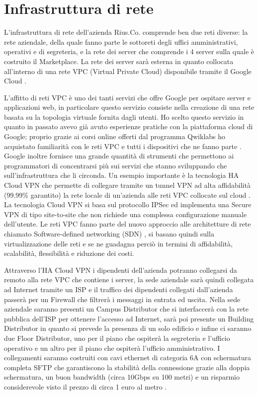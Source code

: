 \section{Infrastruttura di rete}
L'infrastruttura di rete dell'azienda Rius.Co. comprende ben due reti diverse: la rete aziendale, della quale fanno parte le sottoreti degli uffici amministrativi, operativi e di segreteria, e la rete dei server che comprende i 4 server sulla quale è costruito il Marketplace. La rete dei server sarà esterna in quanto collocata all'interno di una rete VPC (Virtual Private Cloud) disponibile tramite il Google Cloud \cite{VPC}. 
\medskip

L'affitto di reti VPC è uno dei tanti servizi che offre Google per ospitare server e applicazioni web, in particolare questo servizio consiste nella creazione di una rete basata su la topologia virtuale fornita dagli utenti. Ho scelto questo servizio in quanto in passato avevo già avuto esperienze pratiche con la piattaforma cloud di Google; proprio grazie ai corsi online offerti dal programma Qwiklabs ho acquistato familiarità con le reti VPC e tutti i dispositivi che ne fanno parte \cite{Qwiklabs}. Google inoltre fornisce una grande quantità di strumenti che permettono ai programmatori di concentrarsi più sui servizi che stanno sviluppando che sull'infrastruttura che li circonda. Un esempio importante è la tecnologia HA Cloud VPN che permette di collegare tramite un tunnel VPN ad alta affidabilità (99.99\% garantito) la rete locale di un'azienda alle reti VPC collocate sul cloud \cite{CloudVPN}. La tecnologia Cloud VPN si basa sul protocollo IPSec ed implementa una Secure VPN di tipo site-to-site che non richiede una complessa configurazione manuale dell'utente. Le reti VPC fanno parte del nuovo approccio alle architetture di rete chiamato Software-defined networking (SDN) \cite{SDN}, si basano quindi sulla virtualizzazione delle reti e se ne guadagna perciò in termini di affidabilità, scalabilità, flessibilità e riduzione dei costi.
\medskip

Attraverso l'HA Cloud VPN i dipendenti dell'azienda potranno collegarsi da remoto alla rete VPC che contiene i server, la sede aziendale sarà quindi collegata ad Internet tramite un ISP e il traffico dei dipendenti collegati dall'azienda passerà per un Firewall che filtrerà i messaggi in entrata ed uscita. Nella sede aziendale saranno presenti un Campus Distributor che si interfaccerà con la rete pubblica dell'ISP per ottenere l'accesso ad Internet, sarà poi presente un Building Distributor in quanto si prevede la presenza di un solo edificio e infine ci saranno due Floor Distributor, uno per il piano che ospiterà la segreteria e l'ufficio operativo e un altro per il piano che ospiterà l'ufficio amministrativo. I collegamenti saranno costruiti con cavi ethernet di categoria 6A con schermatura completa SFTP che garantiscono la stabilità della connessione grazie alla doppia schermatura, un buon bandwidth (circa 10Gbps su 100 metri) e un risparmio considerevole visto il prezzo di circa 1 euro al metro \cite{Cables}. 
